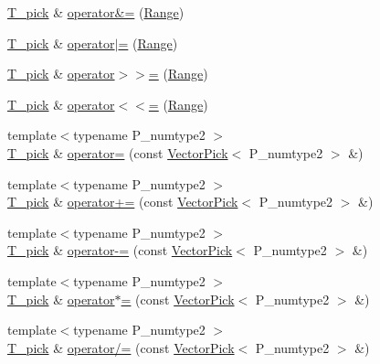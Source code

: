 \begin{DoxyCompactItemize}
\item 
\hyperlink{classVectorPick_ab257fd713ce0f2a81bc79059cec93ac9}{T\+\_\+pick} \& \hyperlink{classVectorPick_a080d6c3c1c3680e0ab0b153a864a3a28}{operator\&=} (\hyperlink{classRange}{Range})
\item 
\hyperlink{classVectorPick_ab257fd713ce0f2a81bc79059cec93ac9}{T\+\_\+pick} \& \hyperlink{classVectorPick_a44d7f80bad747d303a74d49a823bc59a}{operator$\vert$=} (\hyperlink{classRange}{Range})
\item 
\hyperlink{classVectorPick_ab257fd713ce0f2a81bc79059cec93ac9}{T\+\_\+pick} \& \hyperlink{classVectorPick_a0bab68d38b7590ba2cf4e46771ea2bc2}{operator$>$$>$=} (\hyperlink{classRange}{Range})
\item 
\hyperlink{classVectorPick_ab257fd713ce0f2a81bc79059cec93ac9}{T\+\_\+pick} \& \hyperlink{classVectorPick_afbc612fef365e1fb15cdf88f0ac95472}{operator$<$$<$=} (\hyperlink{classRange}{Range})
\item 
{\footnotesize template$<$typename P\+\_\+numtype2 $>$ }\\\hyperlink{classVectorPick_ab257fd713ce0f2a81bc79059cec93ac9}{T\+\_\+pick} \& \hyperlink{classVectorPick_afa2ef22821ed9e2de9cf707ce7b4af22}{operator=} (const \hyperlink{classVectorPick}{Vector\+Pick}$<$ P\+\_\+numtype2 $>$ \&)
\item 
{\footnotesize template$<$typename P\+\_\+numtype2 $>$ }\\\hyperlink{classVectorPick_ab257fd713ce0f2a81bc79059cec93ac9}{T\+\_\+pick} \& \hyperlink{classVectorPick_a9fb36745adc76566b1558d5af5cfe2f9}{operator+=} (const \hyperlink{classVectorPick}{Vector\+Pick}$<$ P\+\_\+numtype2 $>$ \&)
\item 
{\footnotesize template$<$typename P\+\_\+numtype2 $>$ }\\\hyperlink{classVectorPick_ab257fd713ce0f2a81bc79059cec93ac9}{T\+\_\+pick} \& \hyperlink{classVectorPick_a85580812a2fb7fb4e247f9b7be22bc88}{operator-\/=} (const \hyperlink{classVectorPick}{Vector\+Pick}$<$ P\+\_\+numtype2 $>$ \&)
\item 
{\footnotesize template$<$typename P\+\_\+numtype2 $>$ }\\\hyperlink{classVectorPick_ab257fd713ce0f2a81bc79059cec93ac9}{T\+\_\+pick} \& \hyperlink{classVectorPick_a4ab971f5c160427539fb1ec45ecc3326}{operator$\ast$=} (const \hyperlink{classVectorPick}{Vector\+Pick}$<$ P\+\_\+numtype2 $>$ \&)
\item 
{\footnotesize template$<$typename P\+\_\+numtype2 $>$ }\\\hyperlink{classVectorPick_ab257fd713ce0f2a81bc79059cec93ac9}{T\+\_\+pick} \& \hyperlink{classVectorPick_aba0624fa21159cf40ac1b94ea4608b4c}{operator/=} (const \hyperlink{classVectorPick}{Vector\+Pick}$<$ P\+\_\+numtype2 $>$ \&)

\end{DoxyCompactItemize}
